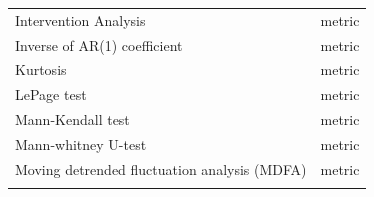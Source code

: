 \documentclass[12pt,twoside,openany]{reedthesis}
\begin{document}
\begin{longtable}[]{@{}lc@{}}
\begin{minipage}[t]{0.31\columnwidth}\raggedright\strut
Intervention Analysis\strut
\end{minipage} & \begin{minipage}[t]{0.34\columnwidth}\centering\strut
metric\strut
\end{minipage}\tabularnewline
\begin{minipage}[t]{0.31\columnwidth}\raggedright\strut
Inverse of AR(1) coefficient\strut
\end{minipage} & \begin{minipage}[t]{0.34\columnwidth}\centering\strut
metric\strut
\end{minipage}\tabularnewline
\begin{minipage}[t]{0.31\columnwidth}\raggedright\strut
Kurtosis\strut
\end{minipage} & \begin{minipage}[t]{0.34\columnwidth}\centering\strut
metric\strut
\end{minipage}\tabularnewline
\begin{minipage}[t]{0.31\columnwidth}\raggedright\strut
LePage test\strut
\end{minipage} & \begin{minipage}[t]{0.34\columnwidth}\centering\strut
metric\strut
\end{minipage}\tabularnewline
\begin{minipage}[t]{0.31\columnwidth}\raggedright\strut
Mann-Kendall test\strut
\end{minipage} & \begin{minipage}[t]{0.34\columnwidth}\centering\strut
metric\strut
\end{minipage}\tabularnewline
\begin{minipage}[t]{0.31\columnwidth}\raggedright\strut
Mann-whitney U-test\strut
\end{minipage} & \begin{minipage}[t]{0.34\columnwidth}\centering\strut
metric\strut
\end{minipage}\tabularnewline
\begin{minipage}[t]{0.31\columnwidth}\raggedright\strut
Moving detrended fluctuation analysis (MDFA)\strut
\end{minipage} & \begin{minipage}[t]{0.34\columnwidth}\centering\strut
metric\strut
\end{minipage}\tabularnewline
\begin{minipage}[t]{0.31\columnwidth}\raggedright\strut

\end{minipage}
\end{longtable}
\end{document}

